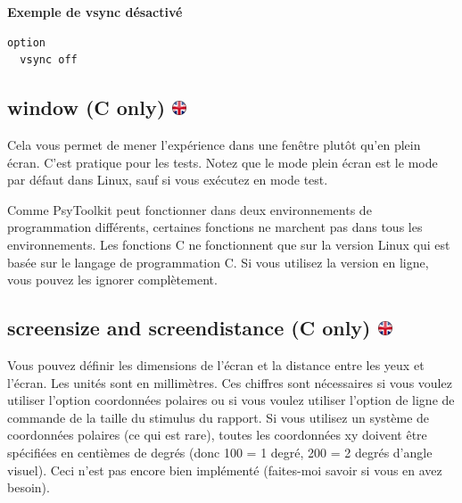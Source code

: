 \documentclass[
]{book}
\begin{document}
\textbf{Exemple de vsync désactivé}

\begin{verbatim}
option
  vsync off
\end{verbatim}

\hypertarget{window-c-only}{%
\subsection[window (C only) ]{\texorpdfstring{window (C only) \href{https://www.psytoolkit.org/doc3.2.0/syntax.html\#options-window}{\protect\includegraphics{img/ukflag.png}}}{window (C only) }}\label{window-c-only}}

Cela vous permet de mener l'expérience dans une fenêtre plutôt qu'en plein écran. C'est pratique pour les tests. Notez que le mode plein écran est le mode par défaut dans Linux, sauf si vous exécutez en mode test.

Comme PsyToolkit peut fonctionner dans deux environnements de programmation différents, certaines fonctions ne marchent pas dans tous les environnements. Les fonctions C ne fonctionnent que sur la version Linux qui est basée sur le langage de programmation C. Si vous utilisez la version en ligne, vous pouvez les ignorer complètement.

\hypertarget{screensize-and-screendistance-c-only}{%
\subsection[screensize and screendistance (C only) ]{\texorpdfstring{screensize and screendistance (C only) \href{https://www.psytoolkit.org/doc3.2.0/syntax.html\#options-screendistance}{\protect\includegraphics{img/ukflag.png}}}{screensize and screendistance (C only) }}\label{screensize-and-screendistance-c-only}}

Vous pouvez définir les dimensions de l'écran et la distance entre les yeux et l'écran. Les unités sont en millimètres. Ces chiffres sont nécessaires si vous voulez utiliser l'option coordonnées polaires ou si vous voulez utiliser l'option de ligne de commande de la taille du stimulus du rapport. Si vous utilisez un système de coordonnées polaires (ce qui est rare), toutes les coordonnées xy doivent être spécifiées en centièmes de degrés (donc 100 = 1 degré, 200 = 2 degrés d'angle visuel). Ceci n'est pas encore bien implémenté (faites-moi savoir si vous en avez besoin).
\end{document}
